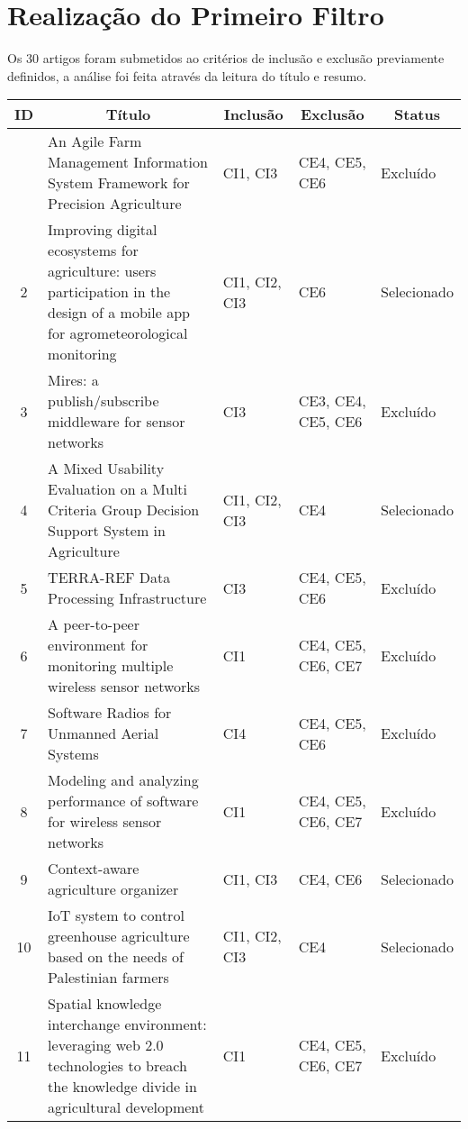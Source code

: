 \documentclass[12pt]{article}
\begin{document}
\section{Realização do Primeiro Filtro}

Os 30 artigos foram submetidos ao critérios de inclusão e exclusão previamente definidos, a análise foi feita através da leitura do título e resumo.

\begin{footnotesize}
	\begin{longtable}{|c|p{7cm}|p{2cm}|p{2cm}|p{1.6cm}|}
		\hline 
		\multicolumn{1}{|c|}{\textbf{ID}} & 
		\multicolumn{1}{c|}{\textbf{Título}} & 
		\multicolumn{1}{c|}{\textbf{Inclusão}} &
		\multicolumn{1}{c|}{\textbf{Exclusão}} &
		\multicolumn{1}{c|}{\textbf{Status}} \\ \hline 
		\endfirsthead
		\endhead
		\endfoot
		\endlastfoot
		1 & An Agile Farm Management Information System Framework for Precision Agriculture & CI1, CI3 & CE4, CE5, CE6 & Excluído \\ \hline
		2 & Improving digital ecosystems for agriculture: users participation in the design of a mobile app for agrometeorological monitoring & CI1, CI2, CI3 & CE6 & Selecionado \\ \hline
		3 & Mires: a publish/subscribe middleware for sensor networks & CI3 & CE3, CE4, CE5, CE6 & Excluído \\ \hline
		4 & A Mixed Usability Evaluation on a Multi Criteria Group Decision Support System in Agriculture & CI1, CI2, CI3 & CE4 & Selecionado \\ \hline
		5 & TERRA-REF Data Processing Infrastructure & CI3 & CE4, CE5, CE6 & Excluído \\ \hline
		6 & A peer-to-peer environment for monitoring multiple wireless sensor networks & CI1 & CE4, CE5, CE6, CE7 & Excluído \\ \hline
		7 & Software Radios for Unmanned Aerial Systems & CI4 & CE4, CE5, CE6 & Excluído \\ \hline
		8 & Modeling and analyzing performance of software for wireless sensor networks & CI1 & CE4, CE5, CE6, CE7 & Excluído \\ \hline
		9 & Context-aware agriculture organizer & CI1, CI3 & CE4, CE6 & Selecionado \\ \hline
		10 & IoT system to control greenhouse agriculture based on the needs of Palestinian farmers & CI1, CI2, CI3 & CE4 & Selecionado \\ \hline
		11 & Spatial knowledge interchange environment: leveraging web 2.0 technologies to breach the knowledge divide in agricultural development & CI1 & CE4, CE5, CE6, CE7 & Excluído \\ \hline

\end{longtable}
\end{footnotesize}
\end{document}
